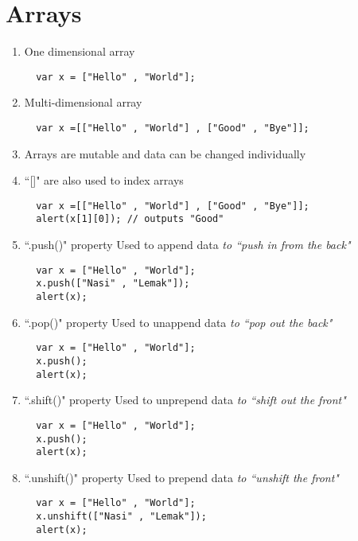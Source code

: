 \documentclass{article}
\begin{document}
\section{Arrays}
\begin{enumerate}
\item One dimensional array
\begin{lstlisting}
  var x = ["Hello" , "World"];
\end{lstlisting}
\item Multi-dimensional array
\begin{lstlisting}
  var x =[["Hello" , "World"] , ["Good" , "Bye"]];
\end{lstlisting}
\item Arrays are mutable and data can be changed individually
\item ``[]" are also used to index arrays
\begin{lstlisting}
  var x =[["Hello" , "World"] , ["Good" , "Bye"]];
  alert(x[1][0]); // outputs "Good"
\end{lstlisting}
\item ``.push()" property
Used to append data \emph{to ``push in from the back"}
\begin{lstlisting}
  var x = ["Hello" , "World"];
  x.push(["Nasi" , "Lemak"]);
  alert(x);
\end{lstlisting}
\item ``.pop()" property
Used to unappend data \emph{to ``pop out the back"}
\begin{lstlisting}
  var x = ["Hello" , "World"];
  x.push();
  alert(x);
\end{lstlisting}
\item ``.shift()" property
Used to unprepend data \emph{to ``shift out the front"}
\begin{lstlisting}
  var x = ["Hello" , "World"];
  x.push();
  alert(x);
\end{lstlisting}
\item ``.unshift()" property
Used to prepend data \emph{to ``unshift the front"}
\begin{lstlisting}
  var x = ["Hello" , "World"];
  x.unshift(["Nasi" , "Lemak"]);
  alert(x);
\end{lstlisting}
\end{enumerate}
\end{document}
